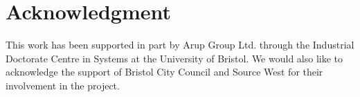 \documentclass[journal]{IEEEtran}
\begin{document}



\section*{Acknowledgment}

This work has been supported in part by Arup Group Ltd. through the
Industrial Doctorate Centre in Systems at the University of Bristol. 
We would also like to acknowledge the support of Bristol City
Council and Source West for their involvement in the project.


\ifCLASSOPTIONcaptionsoff
  \newpage
\fi







%

\end{document}

